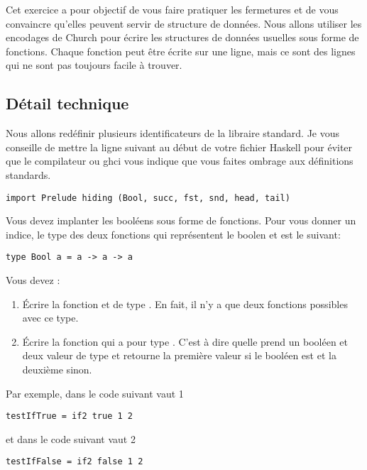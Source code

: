 \begin{Exercise}
\label{ex:datatype_fermeture}
Cet exercice a pour objectif de vous faire pratiquer les fermetures et de
vous convaincre qu'elles peuvent servir de structure de données. Nous
allons utiliser les encodages de Church pour écrire les structures de
données usuelles sous forme de fonctions. Chaque fonction peut être
écrite sur une ligne, mais ce sont des lignes qui ne sont pas toujours
facile à trouver.

\subsection*{Détail technique}
Nous allons redéfinir plusieurs identificateurs de la libraire
standard. Je vous conseille de mettre la ligne suivant au début de
votre fichier Haskell pour éviter que le compilateur ou ghci vous
indique que vous faites ombrage aux définitions standards.
\begin{verbatim}
import Prelude hiding (Bool, succ, fst, snd, head, tail)
\end{verbatim}

\ExePart[title={Booléen}]
\label{sec:boolean}
Vous devez implanter les booléens sous forme de fonctions. Pour vous
donner un indice, le type des deux fonctions qui représentent le
boolen  et  est le suivant:
\begin{verbatim}
type Bool a = a -> a -> a
\end{verbatim}

Vous devez :
\begin{enumerate}
\item Écrire la fonction  et  de
  type . En fait, il n'y a que deux fonctions
  possibles avec ce type.
\item Écrire la fonction  qui a pour type
  . C'est à dire quelle prend un
  booléen et deux valeur de type  et retourne la première
  valeur si le booléen est  et la deuxième sinon.
\end{enumerate}

Par exemple, dans le code suivant  vaut 1
\begin{verbatim}
testIfTrue = if2 true 1 2
\end{verbatim}
et dans le code suivant  vaut 2
\begin{verbatim}
testIfFalse = if2 false 1 2
\end{verbatim}


\end{Exercise}
